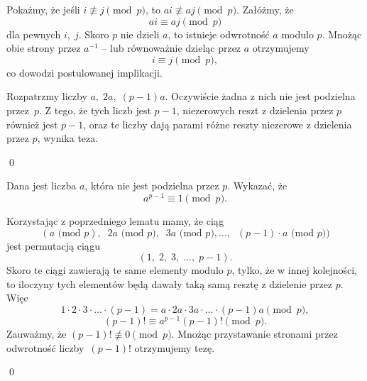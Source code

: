 

\noindent
Pokażmy, że jeśli $i \not\equiv j \pmod{p}$, to $ai \not\equiv aj \pmod{p}$. 
Załóżmy, że 
\[
    ai \equiv aj \pmod{p}
\] 
dla pewnych $i,\; j$. Skoro $p$ nie dzieli $a$, to istnieje odwrotność $a$ modulo $p$. Mnożąc obie strony przez $a^{-1}$ -- lub równoważnie dzieląc przez $a$ otrzymujemy
\[
    i \equiv j \pmod{p},
\]
co dowodzi postulowanej implikacji.

\vspace{10px}
\noindent
Rozpatrzmy liczby $a, \; 2a,\; (p - 1)a$. Oczywiście żadna z nich nie jest podzielna przez~$p$. Z tego, że tych liczb jest $p - 1$, niezerowych reszt z dzielenia przez $p$ również jest $p - 1$, oraz te liczby dają parami różne reszty niezerowe z dzielenia przez $p$, wynika teza.

\qed


\newpage


\noindent
Dana jest liczba $a$, która nie jest podzielna przez $p$. Wykazać, że
\[
    a^{p - 1} \equiv 1 \pmod{p}.
\]


\noindent
Korzystając z poprzedniego lematu mamy, że ciąg
\[
    (a \text{ (mod } p),\;\; 2a \text{ (mod } p),\;\;  3a \text{ (mod } p), ...,\;\;  (p - 1) \cdot a \text{ (mod } p))
\]
jest permutacją ciągu
\[
 (1,\; 2,\; 3,\; ...,\; p - 1).
\]
Skoro te ciągi zawierają te same elementy modulo $p$, tylko, że w innej kolejności, to iloczyny tych elementów będą dawały taką samą resztę z dzielenie przez $p$. Więc
\[
    1 \cdot 2 \cdot 3 \cdot ... \cdot (p - 1) = a \cdot 2a \cdot 3a \cdot ... \cdot (p - 1)a \pmod{p},
\]
\[
    (p - 1)! \equiv a^{p - 1}(p - 1)! \pmod{p}.
\]
Zauważmy, że $(p - 1)! \not\equiv 0 \pmod{p}$. Mnożąc przystawanie stronami przez odwrotność liczby~$(p - 1)!$ otrzymujemy tezę.

\qed

\vspace{10px}
